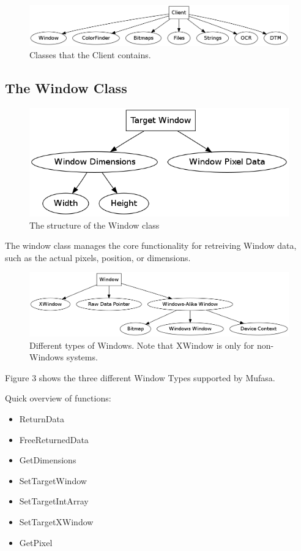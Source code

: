 \documentclass[a4paper, 10pt]{article}
\begin{document}
\begin{figure}[h]
	\includegraphics[scale=0.4]{Pics/Client_Classes}
	\caption{Classes that the Client contains.}
\end{figure}

\pagebreak

\subsection{The Window Class}

\begin{figure}[h]
	\includegraphics[scale=0.4]{Pics/Window}
	\caption{The structure of the Window class}
\end{figure}

The window class manages the core functionality for retreiving Window data, such as the actual pixels, position, or dimensions.

\begin{figure}[h]
	\includegraphics[scale=0.4]{Pics/Window_Types}
	\caption{Different types of Windows. Note that XWindow is only for non-Windows systems.}
\end{figure}

Figure 3 shows the three different Window Types supported by Mufasa.

Quick overview of functions:

\begin{itemize}
	\item ReturnData
	\item FreeReturnedData
	\item GetDimensions
	\item SetTargetWindow
	\item SetTargetIntArray
	\item SetTargetXWindow
	\item GetPixel
\end{itemize}
\end{document}
